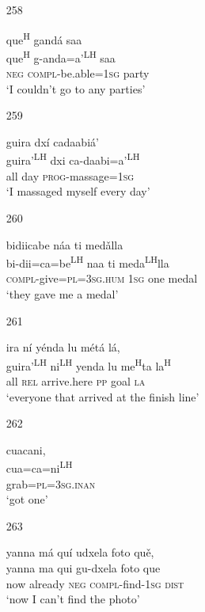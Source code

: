 \begin{itemize}
\item[258]
 
\glll   que\textsuperscript{H} gand\'{a} saa\\
que\textsuperscript{H} g-anda=a'\textsuperscript{LH} saa\\
\textsc{neg} \textsc{compl}-be.able=\textsc{1sg} party\\
\glt `I couldn't go to any parties'
 


\item[259]
 
\glll   guira dx\'{i} cadaabi\'{a}'\\
guira'\textsuperscript{LH} dxi ca-daabi=a'\textsuperscript{LH}\\
all day \textsc{prog}-massage=\textsc{1sg}\\
\glt `I massaged myself every day'
 



\item[260]
 
\glll   bidiicabe n\'{a}a ti med\v{a}lla\\
bi-dii=ca=be\textsuperscript{LH} naa ti meda\textsuperscript{LH}lla\\
\textsc{compl}-give=\textsc{pl}=\textsc{3sg.hum} \textsc{1sg} one medal\\
\glt `they gave me a medal'
 



\item[261]
 
\glll   ira n\'{i} y\'{e}nda lu m\'{e}t\'{a} l\'{a}, \\
guira'\textsuperscript{LH} ni\textsuperscript{LH} yenda lu me\textsuperscript{H}ta la\textsuperscript{H}\\
all \textsc{rel} arrive.here \textsc{pp} goal \textsc{la}\\
\glt `everyone that arrived at the finish line'
 


\item[262]
 
\glll   cuacani, \\
cua=ca=ni\textsuperscript{LH}\\
grab=\textsc{pl}=\textsc{3sg.inan}\\
\glt `got one'
 


\item[263]
 
\glll   yanna m\'{a} qu\'{i} udxela foto qu\v{e},\\
yanna ma qui gu-dxela foto que\\
now already \textsc{neg} \textsc{compl}-find-\textsc{1sg} \textsc{dist}\\
\glt `now I can't find the photo'
 



\end{itemize}
